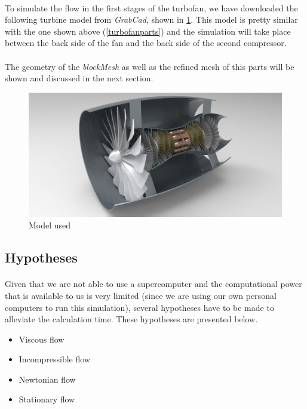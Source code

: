 \paragraph{}To simulate the flow in the first stages of the turbofan, we have downloaded the following turbine model from \textit{GrabCad}, shown in \ref{turbinegrabcad}. This model is pretty similar with the one shown above (\ref{turbofanparts}) and the simulation will take place between the back side of the fan and the back side of the second compressor.

\paragraph{}The geometry of the \textit{blockMesh} as well as the refined mesh of this parts will be shown and discussed in the next section.


\begin{figure}[h!]
\centering
\includegraphics[scale=0.54]{./img/Turbofan.png}
\caption{Model used}
\label{turbinegrabcad}
\end{figure}

\subsection{Hypotheses}

\paragraph{}Given that we are not able to use a supercomputer and the computational power that is available to us is very limited (since we are using our own personal computers to run this simulation), several hypotheses have to be made to alleviate the calculation time. These hypotheses are presented below.

\begin{itemize}
	\item Viscous flow
	\item Incompressible flow
	\item Newtonian flow
	\item Stationary flow
\end{itemize}

